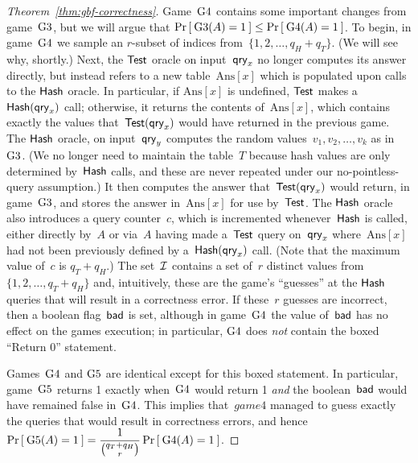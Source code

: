 \begin{proof}[Theorem~\ref{thm:gbf-correctness}]
Game~$\text{G4}$ contains some important changes from game~$\text{G3}$, but we will argue that $\Pr\left[\: \text{G3}(A) = 1 \:\right] \leq \Pr\left[\: \text{G4}(A) = 1 \:\right]$.  To begin, in game~$\text{G4}$ we sample an $r$-subset of indices from~$\{1,2,\ldots,q_H+q_T\}$.  (We will see why, shortly.)  Next, the $\mathsf{Test}$ oracle on input~$\mathsf{qry}_x$ no longer computes its answer directly, but instead refers to a new table~$\mathrm{Ans}[x]$ which is populated upon calls to the $\mathsf{Hash}$ oracle.  In particular, if $\mathrm{Ans}[x]$ is undefined, $\mathsf{Test}$ makes a $\mathsf{Hash}(\mathsf{qry}_x)$ call; otherwise, it returns the contents of~$\mathrm{Ans}[x]$, which contains exactly the values that~$\mathsf{Test}(\mathsf{qry}_x)$ would have returned in the previous game.  The $\mathsf{Hash}$ oracle, on input~$\mathsf{qry}_y$ computes the random values~$v_1,v_2,\ldots,v_k$ as in $\text{G3}$.  (We no longer need to maintain the table~$T$ because hash values are only determined by~$\mathsf{Hash}$ calls, and these are never repeated under our no-pointless-query assumption.)  It then computes the answer that~$\mathsf{Test}(\mathsf{qry}_x)$ would return, in game~$\text{G3}$, and stores the answer in~$\mathrm{Ans}[x]$ for use by~$\mathsf{Test}$.  The $\mathsf{Hash}$ oracle also introduces a query counter~$c$, which is incremented whenever~$\mathsf{Hash}$ is called, either directly by~$A$ or via~$A$ having made a~$\mathsf{Test}$ query on~$\mathsf{qry}_x$ where~$\mathrm{Ans}[x]$ had not been previously defined by a~$\mathsf{Hash}(\mathsf{qry}_x)$ call.    (Note that the maximum value of~$c$ is $q_T + q_H$.)  The set~${\cal I}$ contains a set of~$r$ distinct values from $\{1,2,\ldots,q_T+q_H\}$ and, intuitively, these are the game's ``guesses'' at the $\mathsf{Hash}$ queries that will result in a correctness error.  If these~$r$ guesses are incorrect, then a boolean flag~$\mathsf{bad}$ is set, although in game~$\text{G4}$ the value of~$\mathsf{bad}$ has no effect on the games execution; in particular, $\text{G4}$ does \emph{not} contain the boxed ``Return 0'' statement.

Games~$\text{G4}$ and $\text{G5}$ are identical except for this boxed statement.  In particular, game~$\text{G5}$ returns 1 exactly when~$\text{G4}$ would return 1 \emph{and} the boolean~$\mathsf{bad}$ would have remained false in~$\text{G4}$.   This implies that~$game{4}$ managed to guess exactly the queries that would result in correctness errors, and hence
$\Pr\left[\: \text{G5}(A)=1 \:\right] = \dfrac{1}{\binom{q_T + q_H}{r}}\Pr\left[\: \text{G4}(A)=1 \:\right]$.


\end{proof}
